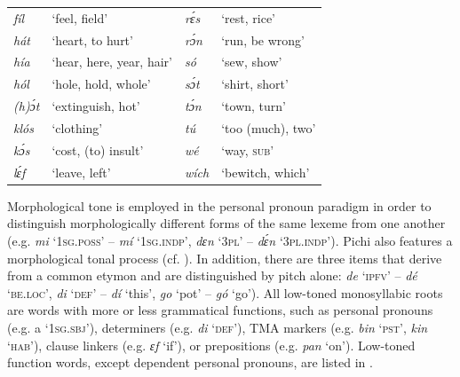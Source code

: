 \begin{exe}
\sn\parbox[t]{.8\textwidth}{
      \vspace{.7\baselineskip}
\begin{tabularx}{\textwidth}{ll ll}
\itshape fíl & ‘feel, field’ & \itshape rɛ́s & ‘rest, rice’\\
\itshape hát & ‘heart, to hurt’ & \itshape rɔ́n & ‘run, be wrong’\\
\itshape hía & ‘hear, here, year, hair’ & \itshape só & ‘sew, show’\\
\itshape hól & ‘hole, hold, whole’ & \itshape sɔ́t & ‘shirt, short’\\
\itshape (h)ɔ́t & ‘extinguish, hot’ & \itshape tɔ́n & ‘town, turn’\\
\itshape klós & ‘clothing’ & \itshape tú & ‘too (much), two’\\
\itshape kɔ́s & ‘cost, (to) insult’ & \itshape wé & ‘way, \textsc{sub’}\\
\itshape lɛ́f & ‘leave, left’ & \itshape wích & ‘bewitch, which’\\
\end{tabularx}
}
\end{exe}
\bigskip

Morphological tone is employed in the personal pronoun paradigm in order to distinguish morphologically different forms of the same lexeme from one another (e.g. \textit{mi} \textsc{‘1sg.poss’} – \textit{mí} \textsc{‘1sg.indp’}, \textit{dɛn} ‘\textsc{3pl}’ – \textit{dɛ́n} ‘\textsc{3pl.indp}’). Pichi also features a morphological tonal process (cf. ). In addition, there are three items that derive from a common etymon and are distinguished by pitch alone: \textit{de} ‘\textsc{ipfv}’ – \textit{dé} ‘\textsc{be}.\textsc{loc}’, \textit{di} \textsc{‘def’} – \textit{dí} ‘this’, \textit{go} ‘pot’ – \textit{gó} ‘go’). All low-toned monosyllabic roots are words with more or less grammatical functions, such as personal pronouns (e.g. a ‘\textsc{1sg.sbj}’), determiners (e.g. \textit{di} ‘\textsc{def}’), TMA markers (e.g. \textit{bin} ‘\textsc{pst}’, \textit{kin} ‘\textsc{hab}’), clause linkers (e.g. \textit{ɛf} ‘if’), or prepositions (e.g. \textit{pan} ‘on’). Low-toned function words, except dependent personal pronouns, are listed in .

